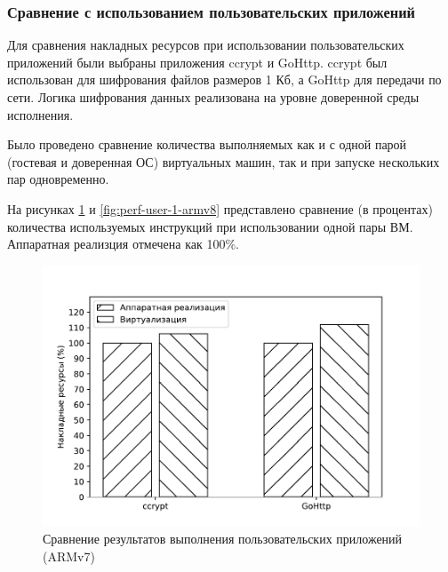 \subsubsection{Сравнение с использованием пользовательских приложений}

Для сравнения накладных ресурсов при использовании пользовательских приложений были выбраны приложения ccrypt и GoHttp. ccrypt был использован для шифрования файлов размеров 1 Кб, а GoHttp для передачи по сети. Логика шифрования данных реализована на уровне доверенной среды исполнения. 

Было проведено сравнение количества выполняемых как и с одной парой (гостевая и доверенная ОС) виртуальных машин, так и при запуске нескольких пар одновременно.

На рисунках \ref{fig:perf-user-1-armv7} и \ref{fig:perf-user-1-armv8} представлено сравнение (в процентах) количества используемых инструкций при использовании одной пары ВМ. Аппаратная реализция отмечена как 100\%.

\begin{figure}[h]
	\centering
	\includegraphics[width=\textwidth]{img/user-1-armv7.pdf}
	\caption{Сравнение результатов выполнения пользовательских приложений (ARMv7)}
	\label{fig:perf-user-1-armv7}
\end{figure}

